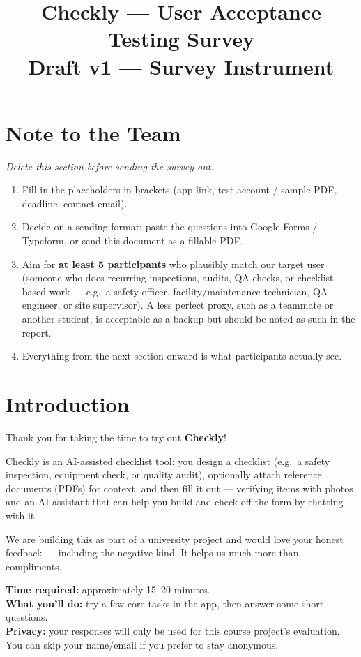 \documentclass[11pt,a4paper]{article}
\title{Checkly --- User Acceptance Testing Survey\vspace{0.3em}\\\large Draft v1 --- Survey Instrument}
\author{}
\date{}
\begin{document}
\maketitle

\section*{Note to the Team}

\textit{Delete this section before sending the survey out.}

\begin{enumerate}
  \item Fill in the placeholders in brackets (app link, test account / sample PDF, deadline, contact email).
  \item Decide on a sending format: paste the questions into Google Forms / Typeform, or send this document as a fillable PDF.
  \item Aim for \textbf{at least 5 participants} who plausibly match our target user (someone who does recurring inspections, audits, QA checks, or checklist-based work --- e.g.\ a safety officer, facility/maintenance technician, QA engineer, or site supervisor). A less perfect proxy, such as a teammate or another student, is acceptable as a backup but should be noted as such in the report.
  \item Everything from the next section onward is what participants actually see.
\end{enumerate}

\section*{Introduction}

Thank you for taking the time to try out \textbf{Checkly}!

Checkly is an AI-assisted checklist tool: you design a checklist (e.g.\ a safety inspection, equipment check, or quality audit), optionally attach reference documents (PDFs) for context, and then fill it out --- verifying items with photos and an AI assistant that can help you build and check off the form by chatting with it.

We are building this as part of a university project and would love your honest feedback --- including the negative kind. It helps us much more than compliments.

\textbf{Time required:} approximately 15--20 minutes.\\
\textbf{What you'll do:} try a few core tasks in the app, then answer some short questions.\\
\textbf{Privacy:} your responses will only be used for this course project's evaluation. You can skip your name/email if you prefer to stay anonymous.
\end{document}
